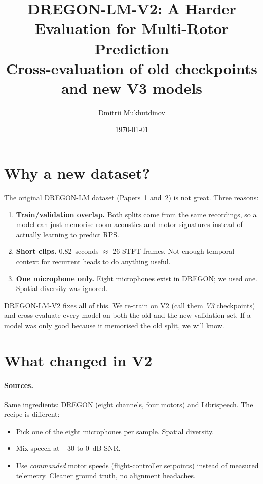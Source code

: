 \documentclass[11pt,a4paper]{article}
\title{\textbf{DREGON-LM-V2: A Harder Evaluation for Multi-Rotor \rps{} Prediction}\\
  \large Cross-evaluation of old checkpoints and new V3 models}
\author{Dmitrii Mukhutdinov}
\date{\today}
\begin{document}
\maketitle

\section{Why a new dataset?}

The original DREGON-LM dataset (Papers~1 and~2) is not great. Three reasons:

\begin{enumerate}
  \item \textbf{Train/validation overlap.} Both splits come from the same
    recordings, so a model can just memorise room acoustics and motor
    signatures instead of actually learning to predict RPS.
  \item \textbf{Short clips.} 0.82~seconds $\approx$ 26 STFT frames. Not
    enough temporal context for recurrent heads to do anything useful.
  \item \textbf{One microphone only.} Eight microphones exist in DREGON; we
    used one. Spatial diversity was ignored.
\end{enumerate}

DREGON-LM-V2 fixes all of this. We re-train on V2 (call them \emph{V3}
checkpoints) and cross-evaluate every model on both the old and the new
validation set. If a model was only good because it memorised the old split,
we will know.

\section{What changed in V2}

\paragraph{Sources.} Same ingredients: DREGON (eight channels, four motors)
and Librispeech. The recipe is different:
\begin{itemize}
  \item Pick one of the eight microphones per sample. Spatial diversity.
  \item Mix speech at $-30$ to $0$~dB SNR.
  \item Use \emph{commanded} motor speeds (flight-controller setpoints)
    instead of measured telemetry. Cleaner ground truth, no alignment headaches.
\end{itemize}
\end{document}
